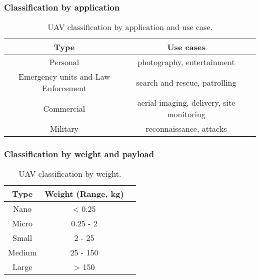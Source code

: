 


\subsubsection*{Classification by application}

\begin{table}[H]
    \centering
    \begin{tabular}{|c|c|c|}
        \hline
        Type                                & Use cases                                 \\
        \hline\hline
        Personal                            & photography, entertainment                \\
        \hline
        Emergency units and Law Enforcement & search and rescue, patrolling             \\
        \hline
        Commercial                          & aerial imaging, delivery, site monitoring \\
        \hline
        Military                            & reconnaissance, attacks                   \\
        \hline
    \end{tabular}
    \caption{UAV classification by application and use case.}
    \label{table:uav-classification-by-application}
\end{table}




\subsubsection*{Classification by weight and payload}

\begin{table}[H]
    \centering
    \begin{tabular}{|c|c|c|}
        \hline
        Type   & Weight (Range, kg) \\
        \hline\hline
        Nano   & < 0.25             \\
        \hline
        Micro  & 0.25 - 2           \\
        \hline
        Small  & 2 - 25             \\
        \hline
        Medium & 25 - 150           \\
        \hline
        Large  & > 150              \\
        \hline
    \end{tabular}
    \caption{UAV classification by weight.}
    \label{table:uav-classification-by-weight}
\end{table}

